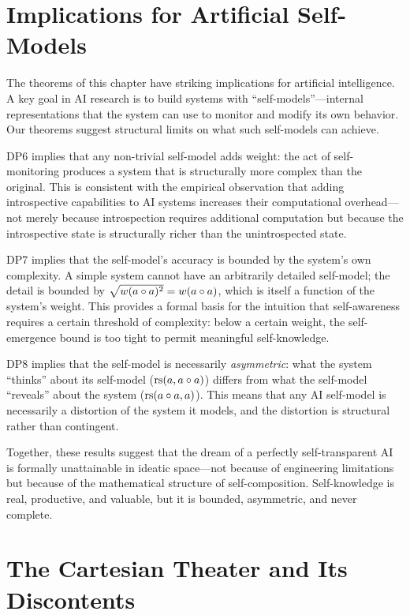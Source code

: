 \section{Implications for Artificial Self-Models}

The theorems of this chapter have striking implications for artificial
intelligence. A key goal in AI research is to build systems with
``self-models''---internal representations that the system can use to
monitor and modify its own behavior. Our theorems suggest structural
limits on what such self-models can achieve.

DP6 implies that any non-trivial self-model adds weight: the act of
self-monitoring produces a system that is structurally more complex than
the original. This is consistent with the empirical observation that
adding introspective capabilities to AI systems increases their
computational overhead---not merely because introspection requires
additional computation but because the introspective state is
structurally richer than the unintrospected state.

DP7 implies that the self-model's accuracy is bounded by the system's
own complexity. A simple system cannot have an arbitrarily detailed
self-model; the detail is bounded by $\sqrt{w(a \circ a)^2}
= w(a \circ a)$, which is itself a function of the system's weight.
This provides a formal basis for the intuition that self-awareness
requires a certain threshold of complexity: below a certain weight,
the self-emergence bound is too tight to permit meaningful
self-knowledge.

DP8 implies that the self-model is necessarily \emph{asymmetric}: what
the system ``thinks'' about its self-model ($\mathrm{rs}(a, a \circ a)$)
differs from what the self-model ``reveals'' about the system
($\mathrm{rs}(a \circ a, a)$). This means that any AI self-model is
necessarily a distortion of the system it models, and the distortion
is structural rather than contingent.

Together, these results suggest that the dream of a perfectly
self-transparent AI is formally unattainable in ideatic space---not
because of engineering limitations but because of the mathematical
structure of self-composition. Self-knowledge is real, productive, and
valuable, but it is bounded, asymmetric, and never complete.

\section{The Cartesian Theater and Its Discontents}

